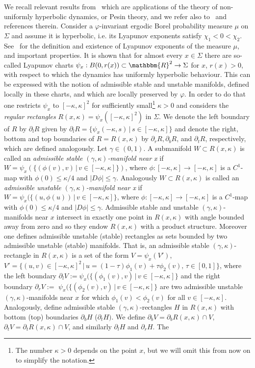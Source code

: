 \documentclass[AHL,Unicode,longabstracts,published]{cedram}
\newcommand{\R}{\mathbbm{R}}
\begin{document}
We recall relevant results from~\cite[Suppl.]{Hasselblatt-Katok} which are applications of the theory of non-uniformly hyperbolic dynamics, or Pesin theory, and we refer also to~\cite{BarreiraPesin} and references therein. Consider a $\varphi$-invariant ergodic Borel probability measure $\mu$ on $\Sigma$ and assume it is hyperbolic, i.e. its Lyapunov exponents satisfy $\chi_1< 0< \chi_2$. See~\cite[Suppl., Section~2]{Hasselblatt-Katok} for the definition and existence of Lyapunov exponents of the measure $\mu$, and important properties. It is shown that for almost every $x \in \Sigma$ there are so-called Lyapunov charts $\psi_x: B(0,r(x)) \subset \R^2 \to \Sigma$ for $x$, $r(x)>0$, with respect to which the dynamics has uniformly hyperbolic behaviour. This can be expressed with the notion of admissible stable and unstable manifolds, defined locally in these charts, and which are locally preserved by $\varphi$. In order to do that one restricts $\psi_x$ to $[-\kappa,\kappa]^2$ for sufficiently small\footnote{The number $\kappa>0$ depends on the point $x$, but we will omit this from now on to simplify the notation.} $\kappa>0$ and considers the \emph{regular rectangles} $R(x,\kappa) = \psi_x([-\kappa,\kappa]^2)$ in $\Sigma$. We denote the left boundary of $R$ by $\partial_l R$ given by $\partial_l R = \{ \psi_x(-\kappa, s) \, | \, s \in [-\kappa, \kappa]\}$ and denote the right, bottom and top boundaries of $R= R(x,\kappa)$ by $\partial_r R, \partial_b R$, and $\partial_t R$, respectively, which are defined analogously. Let $\gamma \in (0,1)$. A submanifold $W \subset R(x,\kappa)$ is called an \emph{admissible stable $(\gamma,\kappa)$-manifold near x} if $W= \psi_x(\{(\phi(v),v)\, |\, v\in [-\kappa,\kappa]\})$, where $\phi:[-\kappa,\kappa] \to [-\kappa,\kappa]$ is a $C^1$-map with $\phi(0) \leq \kappa/4$ and $|D\phi| \leq \gamma$. Analogously $W \subset R(x,\kappa)$ is called an \emph{admissible unstable $(\gamma,\kappa)$-manifold near x} if $W= \psi_x(\{(u,\phi(u))\, |\, v\in [-\kappa,\kappa]\}$, where $\phi:[-\kappa,\kappa] \to [-\kappa,\kappa]$ is a $C^1$-map with $\phi(0) \leq \kappa/4$ and $|D\phi| \leq \gamma$. Admissible stable and unstable $(\gamma,\kappa)$-manifolds near $x$ intersect in exactly one point in $R(x,\kappa)$ with angle bounded away from zero and so they endow $R(x,\kappa)$ with a product structure. Moreover one defines admissible unstable (stable) rectangles as sets bounded by two admissible unstable (stable) manifolds. That is, an admissible stable $(\gamma,\kappa)$-rectangle in $R(x,\kappa)$ is a set of the form $V=\psi_x(V')$, $V'= \{(u,v) \in [-\kappa,\kappa]^2 \, | \, u = (1-\tau) \phi_1(v) + \tau \phi_2(v), \, \tau \in [0,1]\}$, where the left boundary $\partial_l V := \psi_x(\{(\phi_1(v),v)\, |\, v\in [-\kappa,\kappa]\}$ and the right boundary $\partial_r V:=$ $\psi_x(\{(\phi_2(v),v)\, |\, v\in [-\kappa,\kappa]\}$ are two admissible unstable $(\gamma,\kappa)$-manifolds near $x$ for which $\phi_1(v) < \phi_2(v)$ for all $v\in [-\kappa, \kappa]$. Analogously, define admissible stable $(\gamma,\kappa)$-rectangles $H$ in $R(x,\kappa)$ with bottom (top) boundaries $\partial_b H$ ($\partial_t H)$. We define $\partial_b V = \partial_b R(x,\kappa) \cap V$, $\partial_t V = \partial_t R(x,\kappa) \cap V$, and similarly $\partial_l H$ and $\partial_r H$. The 
\end{document}
